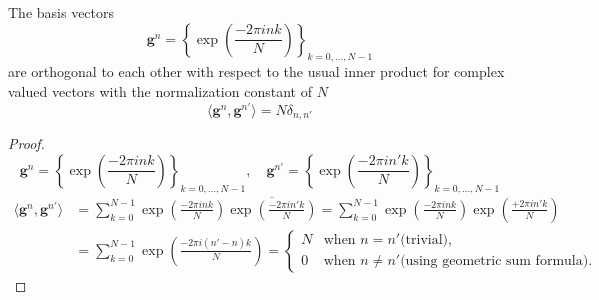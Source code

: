 \begin{Prop}\label{Prop:1ddftbasisvectors}
    The basis vectors
    \begin{equation}\label{eq:1ddftbasisvectors}
        \boldsymbol{g}^n = \left\{\exp\left({\frac{-2\pi ink}{N}}\right)\right\}_{k=0,\ldots,N-1}
    \end{equation}
    are orthogonal to each other with respect to the usual inner product for complex valued vectors 
    with the normalization constant of $N$
    \begin{equation}
        \langle\boldsymbol{g}^n,\boldsymbol{g}^{n'}\rangle= N \delta_{n,n'}
    \end{equation}
\end{Prop}

\begin{proof}
    \begin{equation*}
        \boldsymbol{g}^n = \left\{\exp\left({\frac{-2\pi ink}{N}}\right)\right\}_{k=0,\ldots,N-1}, \quad \boldsymbol{g}^{n'} = \left\{\exp\left({\frac{-2\pi in'k}{N}}\right)\right\}_{k=0,\ldots,N-1}
    \end{equation*}
    \begin{equation*}
    \begin{split} 
        \langle\boldsymbol{g}^n,\boldsymbol{g}^{n'}\rangle &= \sum_{k=0}^{N-1} \exp\left({\frac{-2\pi ink}{N}}\right)\overline{\exp\left({\frac{-2\pi in'k}{N}}\right)}
        = \sum_{k=0}^{N-1} \exp\left({\frac{-2\pi ink}{N}}\right)\exp\left({\frac{+2\pi in'k}{N}}\right)\\
        &= \sum_{k=0}^{N-1} \exp\left({\frac{-2\pi i(n'-n)k}{N}}\right)=
        \begin{cases}
            N & \text{when $n = n'$}\text{(trivial)},\\
            0 & \text{when $n\neq n'$}\text{(using geometric sum formula)}.
        \end{cases}
    \end{split}
\end{equation*}
    
\end{proof}








